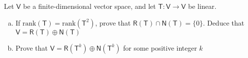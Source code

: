 Let $\mathsf{V}$ be a finite-dimensional vector space, and let
$\mathsf{T}\colon \mathsf{V} \to \mathsf{V}$ be linear.
\begin{enumerate}[(a)]
\item If $\text{rank}(\mathsf{T})=\text{rank}(\mathsf{T}^2)$, prove
  that $\mathsf{R}(\mathsf{T})\cap \mathsf{N}(\mathsf{T}) =
  \{0\}$. Deduce that $\mathsf{V} = \mathsf{R}(\mathsf{T}) \oplus
  \mathsf{N}(\mathsf{T})$
\item Prove that $\mathsf{V} = \mathsf{R}(\mathsf{T}^k) \oplus
  \mathsf{N}(\mathsf{T}^k)$ for some positive integer $k$
\end{enumerate}
